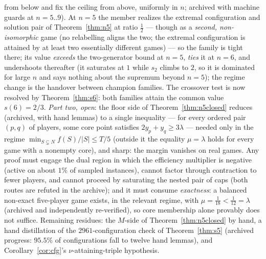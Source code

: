 \documentclass[11pt]{article}
\begin{document}
\begin{enumerate}[label=(\arabic*),nosep]
      from below and fix the ceiling from above, uniformly in $n$;
      archived with machine guards at $n=5..9$).  At $n=5$ the member
      realizes the extremal configuration and solution pair of
      Theorem~\ref{thm:n5} at ratio $\tfrac12$ --- though as a
      \emph{second, non-isomorphic} game (no relabelling aligns the
      two; the extremal configuration is attained by at least two
      essentially different games) --- so the family is tight there; its value \emph{exceeds} the
      two-generator bound at $n=5$,
      \emph{ties} it at $n=6$, and undershoots thereafter (it
      saturates at $1$ while $s_2$ climbs to $2$, so it is dominated
      for large $n$ and says nothing about the supremum beyond
      $n=5$); the regime
      change is the handover between champion families.  The crossover test
      is now resolved by Theorem~\ref{thm:s6}: both families attain the common
      value $s(6)=2/3$.  \emph{Part two, open}: the floor
      side of Theorem~\ref{thm:n5closed} reduces (archived, with hand
      lemmas) to a single inequality --- for every ordered pair $(p,q)$
      of players, some core point satisfies $2y_p+y_q\ge3\lambda$ ---
      needed only in the regime $\min_{S\subsetneq N}f(S)/|S|\le T/5$
      (outside it the equality $\mu=\lambda$ holds for every game with a
      nonempty core), and sharp: the margin vanishes on real games.  Any
      proof must engage the dual region in which the efficiency
      multiplier is negative (active on about $1\%$ of sampled
      instances), cannot factor through contraction to fewer players,
      and cannot proceed by saturating the nested pair of caps
      (both routes are refuted in the archive); and it must consume
      \emph{exactness}: a balanced non-exact five-player game exists,
      in the relevant regime, with $\mu=\tfrac1{18}<\tfrac1{12}=\lambda$
      (archived and independently re-verified), so core membership alone
      provably does not suffice.  Remaining residues: the $M$-side of
      Theorem~\ref{thm:n5closed} by hand, a hand distillation of the
      $2961$-configuration check of Theorem~\ref{thm:s5} (archived
      progress: $95.5\%$ of configurations fall to twelve hand lemmas),
      and Corollary~\ref{cor:cfg}'s $\nu$-attaining-triple hypothesis.
\end{enumerate}
\end{document}
